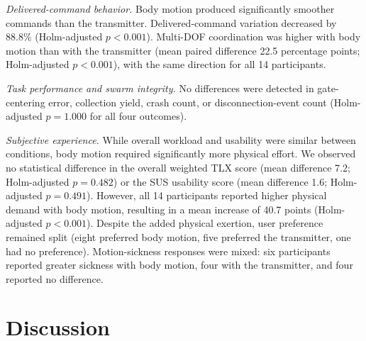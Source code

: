\documentclass[a4paper,10pt,conference]{ieeeconf}
\begin{document}
\emph{Delivered-command behavior.}
Body motion produced significantly smoother commands than the transmitter.
Delivered-command variation decreased by 88.8\% (Holm-adjusted $p<0.001$).
Multi-DOF coordination was higher
with body motion than with the transmitter (mean paired difference 22.5 percentage points; Holm-adjusted
$p<0.001$), with the same direction for all 14 participants.

\emph{Task performance and swarm integrity.} No differences were detected in gate-centering error, collection yield, crash count, or disconnection-event count (Holm-adjusted \(p=1.000\) for all four outcomes). 

\emph{Subjective experience.} While overall workload and usability were similar between conditions, body motion required significantly more physical effort. We observed no statistical difference in the overall weighted TLX score (mean difference 7.2; Holm-adjusted $p=0.482$) or the SUS usability score (mean difference 1.6; Holm-adjusted $p=0.491$). However, all 14 participants reported higher physical demand with body motion, resulting in a mean increase of 40.7 points (Holm-adjusted $p<0.001$). Despite the added physical exertion, user preference remained split (eight preferred body motion, five preferred the transmitter, one had no preference). Motion-sickness responses were mixed: six participants reported greater sickness with body motion, four with the transmitter, and four reported no difference.


\section{Discussion}

\end{document}
